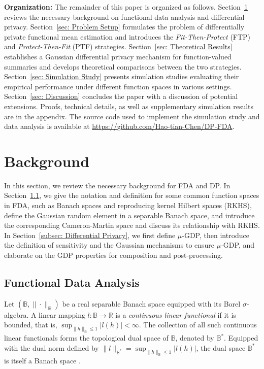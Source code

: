 \documentclass[twoside,11pt]{article}
\begin{document}
\textbf{Organization:} The remainder of this paper is organized as follows. Section~\ref{sec: Background} reviews the necessary background on functional data analysis and differential privacy. Section~\ref{sec: Problem Setup} formulates the problem of differentially private functional mean estimation and introduces the \emph{Fit-Then-Protect} (FTP) and \emph{Protect-Then-Fit} (PTF) strategies. Section~\ref{sec: Theoretical Results} establishes a Gaussian differential privacy mechanism for function-valued summaries and develops theoretical comparisons between the two strategies. Section~\ref{sec: Simulation Study} presents simulation studies evaluating their empirical performance under different function spaces in various settings. Section~\ref{sec: Discussion} concludes the paper with a discussion of potential extensions. Proofs, technical details, as well as supplementary simulation results are in the appendix. The source code used to implement the simulation study and data analysis is available at \url{https://github.com/Hao-tian-Chen/DP-FDA}.

\section{Background}
\label{sec: Background}
In this section, we review the necessary background for FDA and DP. In Section~\ref{subsec: Functional Data Analysis}, we give the notation and definition for some common function spaces in FDA, such as Banach spaces and reproducing kernel Hilbert spaces (RKHS), define the Gaussian random element in a separable Banach space, and introduce the corresponding Cameron-Martin space and discuss its relationship with RKHS. In Section~\ref{subsec: Differential Privacy}, we first define $\mu$-GDP, then introduce the definition of sensitivity and the Gaussian mechanisms to ensure $\mu$-GDP, and elaborate on the GDP properties for composition and post-processing. 

\subsection{Functional Data Analysis}
\label{subsec: Functional Data Analysis}
Let $(\mathbb{B}, \|\cdot\|_{\mathbb{B}})$ be a real separable Banach space equipped with its Borel $\sigma$-algebra. A linear mapping $l: \mathbb{B} \to \mathbb{R}$ is a \emph{continuous linear functional} if it is bounded, that is, $\sup_{\|h\|_{\mathbb{B}} \le 1} |l(h)| < \infty$. The collection of all such continuous linear functionals forms the topological dual space of $\mathbb{B}$, denoted by $\mathbb{B}^*$. Equipped with the dual norm defined by $\|l\|_{\mathbb{B}^*} = \sup_{\|h\|_{\mathbb{B}} \le 1} |l(h)|$, the dual space $\mathbb{B}^*$ is itself a Banach space \citep[Proposition 1.29]{fabian2011banach}.
\end{document}
